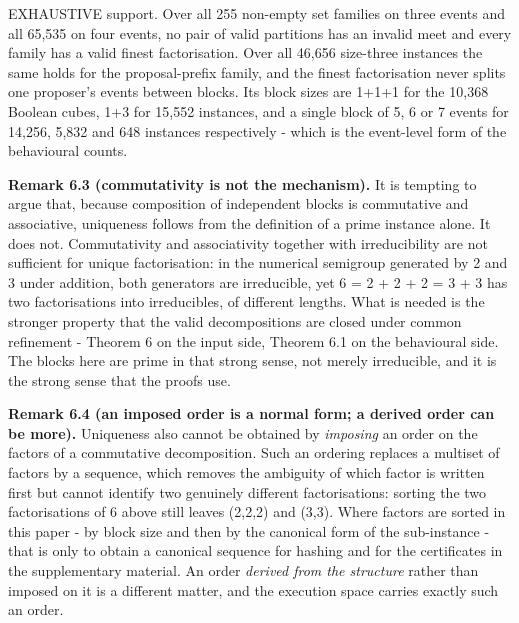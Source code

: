 \documentclass[
  11pt,
]{article}
\begin{document}
EXHAUSTIVE support. Over all 255 non-empty set families on three events
and all 65,535 on four events, no pair of valid partitions has an
invalid meet and every family has a valid finest factorisation. Over all
46,656 size-three instances the same holds for the proposal-prefix
family, and the finest factorisation never splits one proposer's events
between blocks. Its block sizes are 1+1+1 for the 10,368 Boolean cubes,
1+3 for 15,552 instances, and a single block of 5, 6 or 7 events for
14,256, 5,832 and 648 instances respectively - which is the event-level
form of the behavioural counts.

\textbf{Remark 6.3 (commutativity is not the mechanism).} It is tempting
to argue that, because composition of independent blocks is commutative
and associative, uniqueness follows from the definition of a prime
instance alone. It does not. Commutativity and associativity together
with irreducibility are not sufficient for unique factorisation: in the
numerical semigroup generated by 2 and 3 under addition, both generators
are irreducible, yet 6 = 2 + 2 + 2 = 3 + 3 has two factorisations into
irreducibles, of different lengths. What is needed is the stronger
property that the valid decompositions are closed under common
refinement - Theorem 6 on the input side, Theorem 6.1 on the behavioural
side. The blocks here are prime in that strong sense, not merely
irreducible, and it is the strong sense that the proofs use.

\textbf{Remark 6.4 (an imposed order is a normal form; a derived order
can be more).} Uniqueness also cannot be obtained by \emph{imposing} an
order on the factors of a commutative decomposition. Such an ordering
replaces a multiset of factors by a sequence, which removes the
ambiguity of which factor is written first but cannot identify two
genuinely different factorisations: sorting the two factorisations of 6
above still leaves (2,2,2) and (3,3). Where factors are sorted in this
paper - by block size and then by the canonical form of the sub-instance
- that is only to obtain a canonical sequence for hashing and for the
certificates in the supplementary material. An order \emph{derived from
the structure} rather than imposed on it is a different matter, and the
execution space carries exactly such an order.
\end{document}
